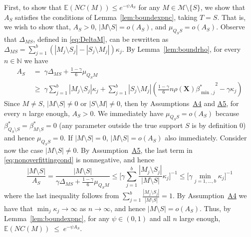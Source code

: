 \documentclass[
  12pt]{article}
\newcommand{\E}{\mathbb{E}}
\newcommand{\N}{\mathbb{N}}
\newcommand{\bX}{\mathbf{X}}
\begin{document}
First, to show that $\E(NC(M)) \leq e^{-\psi A_S}$
for any $M\in\mathcal{M}\setminus \{S\}$, we show that $A_S$ satisfies the conditions of Lemma~\ref{lem:boundexpnc}, taking $T=S$. 
That is, we wish to show that, $A_S>0$, $|M\setminus S|=o(A_S)$, and $\mu_{Q_S S}=o(A_S)$. 
Observe that $\Delta_{MS}$, defined in \eqref{eq:DeltaM}, can be rewritten as $\Delta_{MS}=\sum_{j=1}^b(|M_j\setminus S_j|-|S_j\setminus M_j|)\kappa_j$. By  Lemma~\ref{lem:boundrho}, for every $n\in \N$ we have 
\begin{equation}\label{eq:nonoverfittingcond}
\begin{aligned}
     A_S & \;=\; \gamma \Delta_{MS}+\frac{1-\gamma}{6}\mu_{Q_SM}\\
     & \;\geq\;  \gamma\sum_{j=1}^b|M_j \setminus S_j|\kappa_j + \sum_{j=1}^b |S_j\setminus M_j |\left(\tfrac{1-\gamma}{6} n \rho(\bX) {\beta^*_{\min,j}}^{2} - \gamma\kappa_j\right) 
\end{aligned}
\end{equation} 
Since $M\neq S$, $|M\setminus S|\neq0$ or $|S\setminus M|\neq0$, then by Assumptions~\hyperlink{lab:A4}{A4} and \hyperlink{lab:A5}{A5}, for every $n$ large enough, $A_S>0$. We immediately have $\mu_{Q_S S}=o(A_S)$ because $\beta^*_{Q_S\setminus S}=\beta^*_{M\setminus S}=0$ (any parameter outside the true support $S$ is by definition 0) and hence $\mu_{Q_S S}=0$.
If $|M\setminus S|=0$, $|M\setminus S|=o(A_S)$ also immediately. Consider now the case $|M\setminus S|\neq 0$. By Assumption~\hyperlink{lab:A5}{A5}, the last term in \eqref{eq:nonoverfittingcond} is nonnegative, and hence
$$\frac{|M\setminus S|}{A_S}
= \frac{|M\setminus S|}{\gamma \Delta_{MS}+\frac{1-\gamma}{6}\mu_{Q_SM}}
\leq \bigg[ \gamma\sum_{j=1}^b\frac{|M_j \setminus S_j|}{|M\setminus S|}\kappa_j \bigg]^{-1} \leq \Big[ \gamma\min_{j=1,\ldots,b}\kappa_j \Big]^{-1} $$
where the last inequality follows from $\sum_{j=1}^b\frac{|M_j \setminus S_j|}{|M\setminus S|}=1$. By Assumption~\hyperlink{lab:A4}{A4} we have that $\min_j \kappa_j \to \infty$ as $n \rightarrow \infty$, and hence $|M\setminus S|=o(A_S)$. Thus, %
by Lemma~\ref{lem:boundexpnc}, for any $\psi\in(0,1)$ and all $n$ large enough,
$
\E(NC(M))\;\leq\;e^{-\psi A_S}.
$
\end{document}
